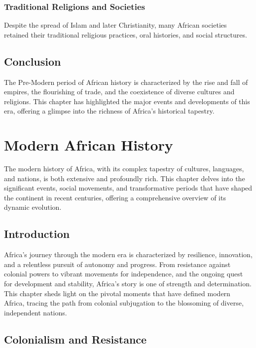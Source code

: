\documentclass[a4paper,12pt]{book}
\begin{document}
\subsection{Traditional Religions and Societies}
Despite the spread of Islam and later Christianity, many African societies retained their traditional religious practices, oral histories, and social structures.

\section{Conclusion}
\label{sec:conclusion-pre-modern-africa}

The Pre-Modern period of African history is characterized by the rise and fall of empires, the flourishing of trade, and the coexistence of diverse cultures and religions. This chapter has highlighted the major events and developments of this era, offering a glimpse into the richness of Africa's historical tapestry.

\chapter{Modern African History}
\label{ch:modern-african-history}

The modern history of Africa, with its complex tapestry of cultures, languages, and nations, is both extensive and profoundly rich. This chapter delves into the significant events, social movements, and transformative periods that have shaped the continent in recent centuries, offering a comprehensive overview of its dynamic evolution.

\section{Introduction}
\label{sec:introduction-modern-africa}

Africa’s journey through the modern era is characterized by resilience, innovation, and a relentless pursuit of autonomy and progress. From resistance against colonial powers to vibrant movements for independence, and the ongoing quest for development and stability, Africa’s story is one of strength and determination. This chapter sheds light on the pivotal moments that have defined modern Africa, tracing the path from colonial subjugation to the blossoming of diverse, independent nations.

\section{Colonialism and Resistance}
\label{sec:colonialism-and-resistance}
\end{document}
